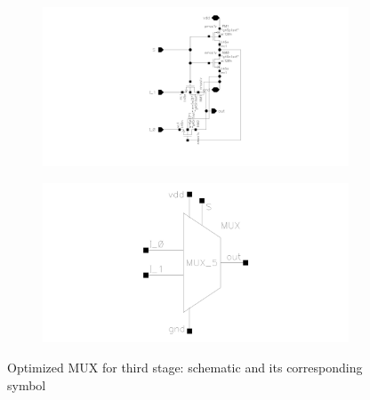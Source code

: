 \documentclass[12pt]{article}
\begin{document}
\begin{figure}[H]
    \centering
    \begin{subfigure}[b]{0.48\textwidth}
        \centering
        \includegraphics[width=\textwidth]{writeup/figures/mux_w2_opt.png}
        \caption{}
        \label{fig:mux_w2_opt}
    \end{subfigure}
    \hfill
    \begin{subfigure}[b]{0.48\textwidth}
        \centering
        \includegraphics[width=\textwidth]{writeup/figures/mux_w2_opt_sym.png}
        \caption{}
        \label{fig:mux_w2_opt_sym}
    \end{subfigure}
    \caption{Optimized MUX for third stage: schematic and its corresponding symbol}
    \label{fig:mux2_opt_comparison}
\end{figure}
\end{document}
